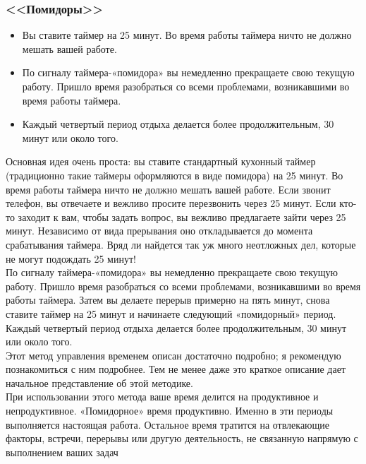 \documentclass{../industrial-development}
\begin{document}
\begin{frame} \frametitle{<<Помидоры>>}
\begin{itemize}
  \item Вы ставите таймер  на 25 минут. Во время работы таймера ничто не должно мешать вашей работе. 
	\item По сигналу таймера-«помидора» вы немедленно прекращаете свою
текущую работу. Пришло время разобраться со всеми проблемами,
возникавшими во время работы таймера.
	\item Каждый четвертый период отдыха делается более продолжительным, 30 минут или около того.
\end{itemize}
\end{frame}
\lecturenotes
Основная идея очень проста: вы ставите стандартный кухонный таймер (традиционно такие таймеры оформляются в виде помидора) на 25 минут. Во время работы таймера ничто не должно мешать вашей работе. Если звонит телефон, вы отвечаете и вежливо просите перезвонить через 25 минут. Если кто-то заходит к вам, чтобы задать вопрос, вы вежливо предлагаете зайти через 25 минут. Независимо от вида прерывания оно откладывается до момента срабатывания таймера. Вряд ли найдется так уж много неотложных дел, которые не могут подождать 25 минут!\\
По сигналу таймера-«помидора» вы немедленно прекращаете свою текущую работу. Пришло время разобраться со всеми проблемами, возникавшими во время работы таймера. Затем вы делаете перерыв примерно на пять минут, снова ставите таймер на 25 минут и начинаете следующий «помидорный» период. Каждый четвертый период отдыха делается более продолжительным, 30 минут или около того.\\
Этот метод управления временем описан достаточно подробно; я рекомендую познакомиться с ним подробнее. Тем не менее даже это краткое описание дает начальное представление об этой методике.\\
При использовании этого метода ваше время делится на продуктивное и непродуктивное. «Помидорное» время продуктивно. Именно в эти периоды выполняется настоящая работа. Остальное время тратится на отвлекающие факторы, встречи, перерывы или другую деятельность, не связанную напрямую с выполнением ваших задач
\end{document}
